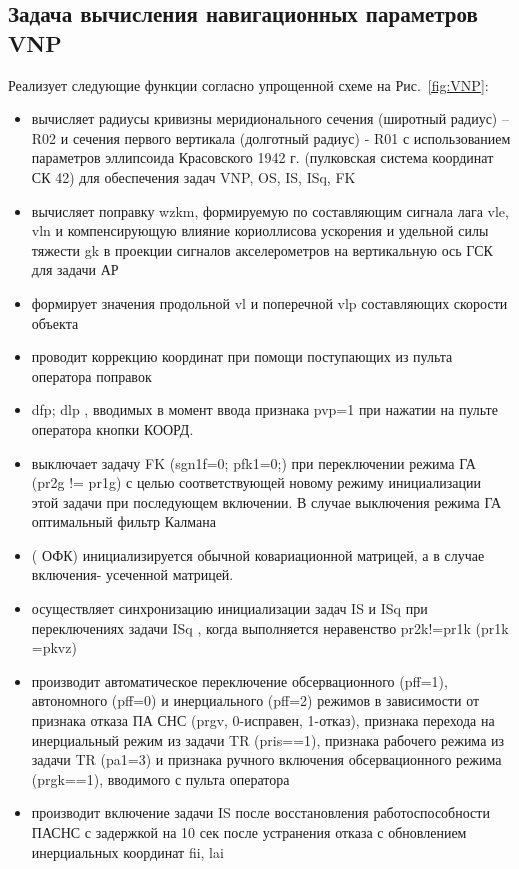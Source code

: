 \subsection{Задача вычисления навигационных параметров VNP}
Реализует следующие функции согласно упрощенной схеме на Рис.~\ref{fig:VNP}:
\begin{itemize}
\item вычисляет радиусы кривизны  меридионального сечения (широтный радиус) –R02  и сечения первого вертикала (долготный радиус) - R01  
    с использованием параметров эллипсоида Красовского 1942 г.  (пулковская система координат СК 42)  для  обеспечения   задач 
    VNP,  OS,  IS,  ISq,  FK 
    \item вычисляет  поправку   wzkm,  формируемую по  составляющим  сигнала  лага  vle,  vln  и компенсирующую  влияние кориоллисова ускорения и 
    удельной силы тяжести gk в  проекции сигналов акселерометров на вертикальную ось ГСК  для  задачи  АР 
    \item формирует значения  продольной  vl  и поперечной vlp  составляющих   скорости объекта   
    \item проводит коррекцию координат  при помощи поступающих из пульта оператора поправок
    \item dfp;  dlp  , вводимых в момент ввода признака  pvp=1  при нажатии на пульте оператора кнопки КООРД.  
    \item выключает  задачу  FK (sgn1f=0;  pfk1=0;)  при  переключении режима  ГА (pr2g != pr1g)  с целью  соответствующей новому  режиму  
    инициализации  этой задачи при последующем включении.  В случае  выключения режима ГА  оптимальный фильтр Калмана
    \item ( ОФК)  инициализируется   обычной ковариационной матрицей, а в случае включения- усеченной матрицей.
    \item осуществляет синхронизацию  инициализации задач  IS  и ISq  при  переключениях задачи ISq , когда  выполняется неравенство   
    pr2k!=pr1k  (pr1k =pkvz)
    \item производит автоматическое переключение обсервационного (pff=1), автономного (pff=0) и инерциального (pff=2) режимов  в  зависимости от 
    признака  отказа ПА СНС (prgv, 0-исправен, 1-отказ),  признака перехода на инерциальный режим из задачи  TR  (pris==1),  признака  
    рабочего режима  из задачи  TR  (pa1=3)  и  признака  ручного включения обсервационного режима (prgk==1),  вводимого с пульта оператора  
    \item производит включение задачи  IS  после   восстановления работоспособности ПАСНС с  задержкой на 10 сек  после  устранения отказа  с 
    обновлением инерциальных  координат  fii, lai 
\end{itemize}
